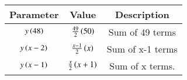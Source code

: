 \begin{tabular}{|c|c|c|}
\hline
Parameter & Value & Description \\
\hline
$y\left(48\right)$ & $ \frac{49}{2}\left(50\right)$ & Sum of 49 terms \\
\hline
$y\left(x-2\right)$ & $\frac{x-1}{2}\left(x\right)$ & Sum of x-1 terms \\
\hline
$y\left(x-1\right)$ & $\frac{x}{2}\left(x+1\right)$ & Sum of x terms. \\
\hline
\end{tabular}